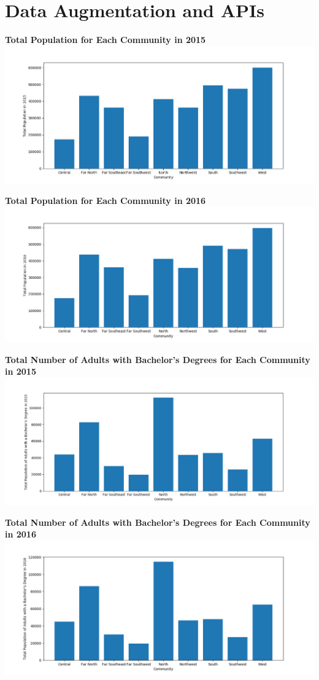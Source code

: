 \documentclass[letterpaper,12pt]{article}
\begin{document}
\section{Data Augmentation and APIs}
\noindent \textbf{Total Population for Each Community in 2015} \\
\includegraphics[scale=.6]{totalpop15.png}

\noindent \textbf{Total Population for Each Community in 2016} \\
\includegraphics[scale=.6]{totalpop16.png}

\newpage

\noindent \textbf{Total Number of Adults with Bachelor's Degrees for Each Community in 2015} \\
\includegraphics[scale=.6]{totaldeg15.png}

\noindent \textbf{Total Number of Adults with Bachelor's Degrees for Each Community in 2016} \\
\includegraphics[scale=.6]{totaldeg16.png}
\end{document}
